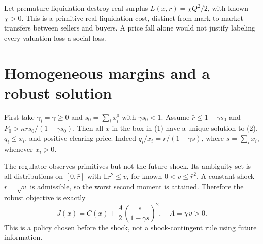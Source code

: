 \documentclass[11pt,a4paper]{article}
\theoremstyle{remark}
\newcommand{\E}{\mathbb E}
\begin{document}
Let premature liquidation destroy real surplus $L(x,r)=\chi Q^2/2$, with known $\chi>0$. This is a primitive real liquidation cost, distinct from mark-to-market transfers between sellers and buyers. A price fall alone would not justify labeling every valuation loss a social loss.

\section{Homogeneous margins and a robust solution}
First take $\gamma_i=\gamma\ge0$ and $s_0=\sum_ix_i^0$ with $\gamma s_0<1$. Assume $\bar r\le1-\gamma s_0$ and $P_0>\kappa\bar r s_0/(1-\gamma s_0)$. Then all $x$ in the box in (1) have a unique solution to (2), $q_i\le x_i$, and positive clearing price. Indeed $q_i/x_i=r/(1-\gamma s)$, where $s=\sum_ix_i$, whenever $x_i>0$.

The regulator observes primitives but not the future shock. Its ambiguity set is all distributions on $[0,\bar r]$ with $\E r^2\le v$, for known $0<v\le\bar r^2$. A constant shock $r=\sqrt v$ is admissible, so the worst second moment is attained. Therefore the robust objective is exactly
\[
 J(x)=C(x)+\frac{A}{2}\left(\frac{s}{1-\gamma s}\right)^2,
 \quad A=\chi v>0. \tag{4}
\]
This is a policy chosen before the shock, not a shock-contingent rule using future information.
\end{document}
